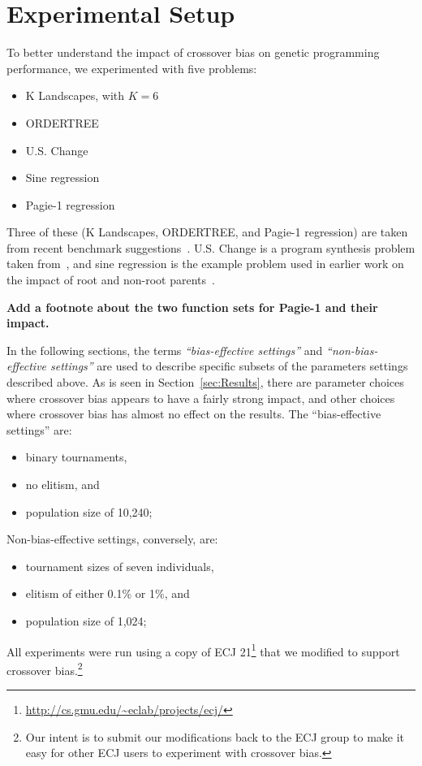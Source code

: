 \documentclass{sig-alternate}
\begin{document}
\section{Experimental Setup} \label{sec:Experiments}

To better understand the impact of crossover bias on genetic programming performance, we experimented with five problems:
\begin{itemize}
	\item K Landscapes, with $K=6$ \cite{vanneschi2011k}
	\item ORDERTREE \cite{hoang2006ordertree}
	\item U.S. Change
	\item Sine regression \cite{poli08:fieldguide}
	\item Pagie-1 regression \cite{}
\end{itemize}
Three of these (K Landscapes, ORDERTREE, and Pagie-1 regression) are taken from recent benchmark suggestions~\cite{gp-benchmarks-2013}. U.S. Change is a program synthesis problem taken from~\cite{USChangeSource}, and sine regression is the example problem used in earlier work on the impact of root and non-root parents~\cite{McPheeDonatucciDramdahl:2014}.

\textbf{Add a footnote about the two function sets for Pagie-1 and their impact.}

In the following sections, the terms \emph{``bias-effective settings''} and \emph{``non-bias-effective settings''} 
are used to
describe specific subsets of the parameters settings described above. As is seen in Section~\ref{sec:Results}, 
there are parameter choices where crossover bias appears to have a fairly strong impact, and other choices 
where crossover bias has almost no effect on the results. The ``bias-effective settings'' are:
\begin{itemize}
\item binary tournaments,
\item no elitism, and
\item population size of 10,240;
\end{itemize}
Non-bias-effective settings, conversely, are:
\begin{itemize}
\item tournament sizes of seven individuals,
\item elitism of either 0.1\% or 1\%, and
\item population size of 1,024;
\end{itemize}

All experiments were run using a copy of ECJ 21\footnote{\url{http://cs.gmu.edu/~eclab/projects/ecj/}} 
that we modified to support crossover bias.\footnote{Our intent is to submit our modifications back to the 
ECJ group to make it easy for other ECJ users to experiment with crossover bias.}
\end{document}
